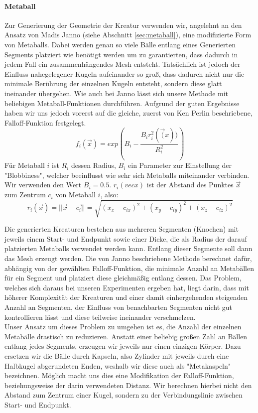 \paragraph{Metaball}\label{Metaball_Gen}
Zur Generierung der Geometrie der Kreatur verwenden wir, angelehnt an den Ansatz von Madis Janno \cite{Janno20182dCG} (siehe Abschnitt \ref{sec:metaball}), eine modifizierte Form von Metaballs. Dabei werden genau so viele Bälle entlang eines Generierten Segments platziert wie benötigt werden um zu garantierten, dass dadurch in jedem Fall ein zusammenhängendes Mesh entsteht. Tatsächlich ist jedoch der Einfluss nahegelegener Kugeln aufeinander so groß, dass dadurch nicht nur die minimale Berührung der einzelnen Kugeln entsteht, sondern diese glatt ineinander übergehen. Wie auch bei Janno lässt sich unsere Methode mit beliebigen Metaball-Funktionen durchführen. Aufgrund der guten Ergebnisse haben wir uns jedoch vorerst auf die gleiche, zuerst von Ken Perlin beschriebene, Falloff-Funktion festgelegt.
\[f_i(\vec{x}) = exp(B_i - \frac{B_ir_i^2(\vec(x))}{R_i^2})\]
Für Metaball $i$ ist $R_i$ dessen Radius, $B_i$ ein Parameter zur Einstellung der "Blobbiness", welcher beeinflusst wie sehr sich Metaballs miteinander verbinden. Wir verwenden den Wert $B_i = 0.5$. $r_i(vec{x})$ ist der Abstand des Punktes $\vec{x}$ zum Zentrum $c_i$ von Metaball $i$, also: \[r_i(\vec{x})=||\vec{x}-\vec{c_i}||=\sqrt{(x_x-c_{ix})^2+(x_y-c_{iy})^2+(x_z-c_{iz})^2}\]

Die generierten Kreaturen bestehen aus mehreren Segmenten (Knochen) mit jeweils einem Start- und Endpunkt sowie einer Dicke, die als Radius der darauf platzierten Metaballs verwendet werden kann. Entlang dieser Segmente soll dann das Mesh erzeugt werden. Die von Janno beschriebene Methode berechnet dafür, abhängig von der gewählten Falloff-Funktion, die minimale Anzahl an Metabällen für ein Segment und platziert diese gleichmäßig entlang dessen. Das Problem, welches sich daraus bei unseren Experimenten ergeben hat, liegt darin, dass mit höherer Komplexität der Kreaturen und einer damit einhergehenden steigenden Anzahl an Segmenten, der Einfluss von benachbarten Segmenten nicht gut kontrollieren lässt und diese teilweise ineinander verschmelzen. \\

Unser Ansatz um dieses Problem zu umgehen ist es, die Anzahl der einzelnen Metabälle drastisch zu reduzieren. Anstatt einer beliebig großen Zahl an Bällen entlang jedes Segments, erzeugen wir jeweils nur einen einzigen Körper. Dazu ersetzen wir die Bälle durch Kapseln, also Zylinder mit jeweils durch eine Halbkugel abgerundeten Enden, weshalb wir diese auch als "Metakaspeln" bezeichnen. Möglich macht uns dies eine Modifikation der Falloff-Funktion, beziehungsweise der darin verwendeten Distanz. Wir berechnen hierbei nicht den Abstand zum Zentrum einer Kugel, sondern zu der Verbindungslinie zwischen Start- und Endpunkt. \\

